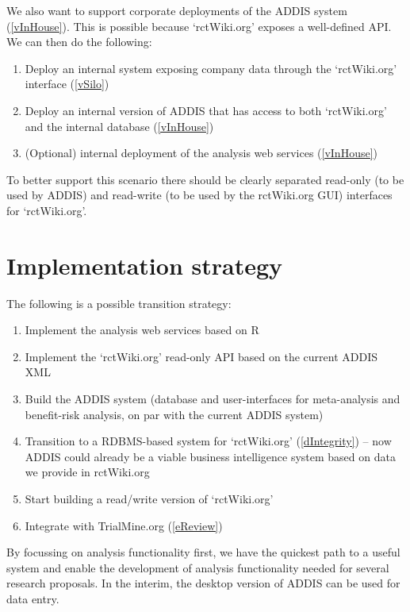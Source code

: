 \documentclass[a4paper]{article}
\begin{document}
We also want to support corporate deployments of the ADDIS system (\ref{vInHouse}). This is possible because `rctWiki.org' exposes a well-defined API. We can then do the following:
\begin{enumerate}
\item Deploy an internal system exposing company data through the `rctWiki.org' interface (\ref{vSilo})
\item Deploy an internal version of ADDIS that has access to both `rctWiki.org' and the internal database (\ref{vInHouse})
\item (Optional) internal deployment of the analysis web services (\ref{vInHouse})
\end{enumerate}
To better support this scenario there should be clearly separated read-only (to be used by ADDIS) and read-write (to be used by the rctWiki.org GUI) interfaces for `rctWiki.org'.

\section{Implementation strategy}
The following is a possible transition strategy:
\begin{enumerate}
\item Implement the analysis web services based on R
\item Implement the `rctWiki.org' read-only API based on the current ADDIS XML
\item Build the ADDIS system (database and user-interfaces for meta-analysis and benefit-risk analysis, on par with the current ADDIS system)
\item Transition to a RDBMS-based system for `rctWiki.org' (\ref{dIntegrity}) -- now ADDIS could already be a viable business intelligence system based on data we provide in rctWiki.org
\item Start building a read/write version of `rctWiki.org'
\item Integrate with TrialMine.org (\ref{eReview})
\end{enumerate}
By focussing on analysis functionality first, we have the quickest path to a useful system and enable the development of analysis functionality needed for several research proposals.
In the interim, the desktop version of ADDIS can be used for data entry.
\end{document}
